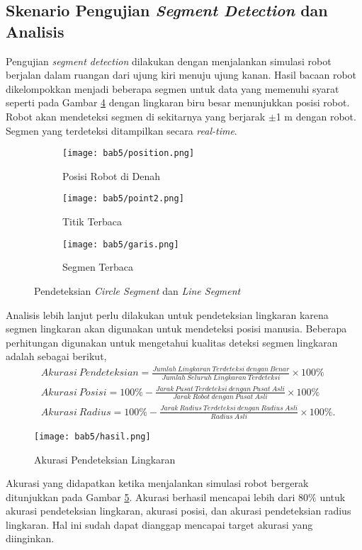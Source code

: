 \subsection{Skenario Pengujian \textit{Segment Detection} dan Analisis}
\label{subsec:Skenario54}

Pengujian \textit{segment detection} dilakukan dengan menjalankan simulasi robot berjalan dalam ruangan dari ujung kiri menuju ujung kanan. Hasil bacaan robot dikelompokkan menjadi beberapa segmen untuk data yang memenuhi syarat seperti pada Gambar \ref*{fig:Ch05_circ_segment} dengan lingkaran biru besar menunjukkan posisi robot. Robot akan mendeteksi segmen di sekitarnya yang berjarak $\pm$1 m dengan robot. Segmen yang terdeteksi ditampilkan secara \textit{real-time}. 

\begin{figure}[H]
    \centering    
    \begin{subfigure}[b]{.7\linewidth}\texttt{[image: bab5/position.png]}\caption{Posisi Robot di Denah}\label{Fig:Ch05_segmen1}\end{subfigure}
    \hfill
    \vfill
    \begin{subfigure}[b]{.45\linewidth}\texttt{[image: bab5/point2.png]}\caption{Titik Terbaca}\label{Fig:Ch05_segmen2}\end{subfigure}
    \begin{subfigure}[b]{.45\linewidth}\texttt{[image: bab5/garis.png]}\caption{Segmen Terbaca}\label{Fig:Ch05_segmen3}\end{subfigure}
    \caption{Pendeteksian \textit{Circle Segment} dan \textit{Line Segment}}
        \label{fig:Ch05_circ_segment}
\end{figure}

Analisis lebih lanjut perlu dilakukan untuk pendeteksian lingkaran karena segmen lingkaran akan digunakan untuk mendeteksi posisi manusia. Beberapa perhitungan digunakan untuk mengetahui kualitas deteksi segmen lingkaran adalah sebagai berikut,
\begin{align}
    \label{eqn:Akurasi}
    &Akurasi\ Pendeteksian = \frac{Jumlah\ Lingkaran\ Terdeteksi\ dengan\ Benar}{Jumlah\ Seluruh\ Lingkaran\ Terdeteksi}\times100\%\\
    &Akurasi\ Posisi =100\%-\frac{Jarak\ Pusat\ Terdeteksi\ dengan\ Pusat\ Asli}{Jarak\ Robot\ dengan\ Pusat\ Asli}\times100\%\\
    &Akurasi\ Radius =100\% - \frac{Jarak\ Radius\ Terdeteksi\ dengan\ Radius\ Asli}{Radius\ Asli}\times100\%.
\end{align}
\begin{figure}[H]
    \centering
    \texttt{[image: bab5/hasil.png]}
    \caption{Akurasi Pendeteksian Lingkaran}
        \label{fig:Ch05_hasil_akurasi}
\end{figure}
Akurasi yang didapatkan ketika menjalankan simulasi robot bergerak ditunjukkan pada Gambar \ref*{fig:Ch05_hasil_akurasi}. Akurasi berhasil mencapai lebih dari $80\%$ untuk akurasi pendeteksian lingkaran, akurasi posisi, dan akurasi pendeteksian radius lingkaran. Hal ini sudah dapat dianggap mencapai target akurasi yang diinginkan.

